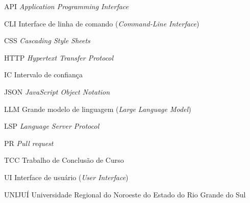 \documentclass[
    12pt,               %
    oneside,            %
    a4paper,            %
    chapter=TITLE,      %
    section=TITLE,      %
    english,            %
    brazilian,             %
    article             %
]{abntex2}
\begin{document}
\begin{siglas}
    \item[API] \textit{Application Programming Interface}
    \item[CLI] Interface de linha de comando (\textit{Command-Line Interface})
    \item[CSS] \textit{Cascading Style Sheets}
    \item[HTTP] \textit{Hypertext Transfer Protocol}
    \item[IC] Intervalo de confiança
    \item[JSON] \textit{JavaScript Object Notation}
    \item[LLM] Grande modelo de linguagem (\textit{Large Language Model})
    \item[LSP] \textit{Language Server Protocol}
    \item[PR] \textit{Pull request}
    \item[TCC] Trabalho de Conclusão de Curso
    \item[UI] Interface de usuário (\textit{User Interface})
    \item[UNIJUÍ] Universidade Regional do Noroeste do Estado do Rio Grande do Sul
\end{siglas}


\tableofcontents*
\cleardoublepage


\begin{apresentacao}
    \imprimirapresentacao
\end{apresentacao}
\newpage

\imprimirpaginaresumos


\textual







\postextual
\end{document}
